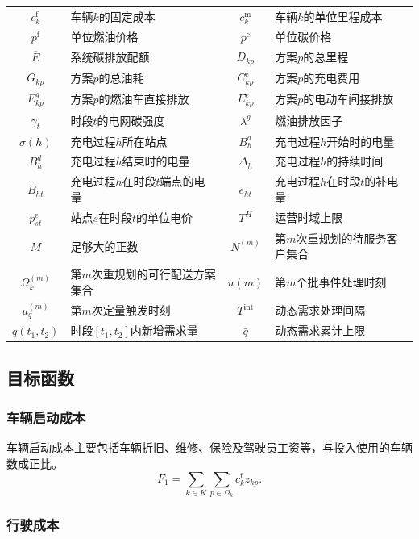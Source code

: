 \begin{table}[H]
\begin{tabularx}{\linewidth}{@{}c>{\RaggedRight\arraybackslash}Xc>{\RaggedRight\arraybackslash}X@{}}
$c_k^{\mathrm f}$ & 车辆$k$的固定成本 & $c_k^{\mathrm m}$ & 车辆$k$的单位里程成本\\
$p^{\mathrm f}$ & 单位燃油价格 & $p^{\mathrm c}$ & 单位碳价格\\
$\overline E$ & 系统碳排放配额 & $D_{kp}$ & 方案$p$的总里程\\
$G_{kp}$ & 方案$p$的总油耗 & $C_{kp}^{\mathrm e}$ & 方案$p$的充电费用\\
$E_{kp}^{g}$ & 方案$p$的燃油车直接排放 & $E_{kp}^{e}$ & 方案$p$的电动车间接排放\\
$\gamma_t$ & 时段$t$的电网碳强度 & $\lambda^{g}$ & 燃油排放因子\\
$\sigma(h)$ & 充电过程$h$所在站点 & $B_h^{a}$ & 充电过程$h$开始时的电量\\
$B_h^{d}$ & 充电过程$h$结束时的电量 & $\Delta_h$ & 充电过程$h$的持续时间\\
$B_{ht}$ & 充电过程$h$在时段$t$端点的电量 & $e_{ht}$ & 充电过程$h$在时段$t$的补电量\\
$p_{st}^{\mathrm e}$ & 站点$s$在时段$t$的单位电价 & $T^{H}$ & 运营时域上限\\
$M$ & 足够大的正数 & $N^{(m)}$ & 第$m$次重规划的待服务客户集合\\
$\Omega_k^{(m)}$ & 第$m$次重规划的可行配送方案集合 & $u(m)$ & 第$m$个批事件处理时刻\\
$u_q^{(m)}$ & 第$m$次定量触发时刻 & $T^{\mathrm{int}}$ & 动态需求处理间隔\\
$q(t_1,t_2)$ & 时段$[t_1,t_2]$内新增需求量 & $\bar q$ & 动态需求累计上限\\
\bottomrule
\end{tabularx}
\end{table}

\subsection{目标函数}

\subsubsection{车辆启动成本}

车辆启动成本主要包括车辆折旧、维修、保险及驾驶员工资等，与投入使用的车辆数成正比。
\begin{equation}
F_1=\sum_{k\in K}\sum_{p\in\Omega_k}c_k^{\mathrm f}z_{kp}.
\label{eq:unified-f1}
\end{equation}

\subsubsection{行驶成本}


